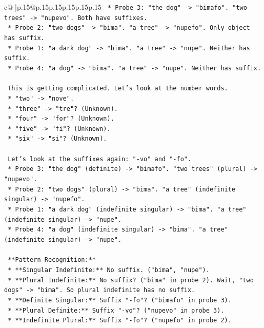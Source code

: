 \documentclass{article}
\begin{document}
{\begin{supertabular}{c@{$\;$}|p{.15\linewidth}@{}p{.15\linewidth}p{.15\linewidth}p{.15\linewidth}p{.15\linewidth}p{.15\linewidth}}
{{{\texttt{        *   Probe 3: "the dog" {-}> "bimafo". "two trees" {-}> "nupevo". Both have suffixes.} \\
\texttt{        *   Probe 2: "two dogs" {-}> "bima". "a tree" {-}> "nupefo". Only object has suffix.} \\
\texttt{        *   Probe 1: "a dark dog" {-}> "bima". "a tree" {-}> "nupe". Neither has suffix.} \\
\texttt{        *   Probe 4: "a dog" {-}> "bima". "a tree" {-}> "nupe". Neither has suffix.} \\
\\ 
\texttt{    This is getting complicated. Let's look at the number words.} \\
\texttt{    *   "two" {-}> "nove".} \\
\texttt{    *   "three" {-}> "tre"? (Unknown).} \\
\texttt{    *   "four" {-}> "for"? (Unknown).} \\
\texttt{    *   "five" {-}> "fi"? (Unknown).} \\
\texttt{    *   "six" {-}> "si"? (Unknown).} \\
\\ 
\texttt{    Let's look at the suffixes again: "{-}vo" and "{-}fo".} \\
\texttt{    *   Probe 3: "the dog" (definite) {-}> "bimafo". "two trees" (plural) {-}> "nupevo".} \\
\texttt{    *   Probe 2: "two dogs" (plural) {-}> "bima". "a tree" (indefinite singular) {-}> "nupefo".} \\
\texttt{    *   Probe 1: "a dark dog" (indefinite singular) {-}> "bima". "a tree" (indefinite singular) {-}> "nupe".} \\
\texttt{    *   Probe 4: "a dog" (indefinite singular) {-}> "bima". "a tree" (indefinite singular) {-}> "nupe".} \\
\\ 
\texttt{    **Pattern Recognition:**} \\
\texttt{    *   **Singular Indefinite:** No suffix. ("bima", "nupe").} \\
\texttt{    *   **Plural Indefinite:** No suffix? ("bima" in probe 2). Wait, "two dogs" {-}> "bima". So plural indefinite has no suffix.} \\
\texttt{    *   **Definite Singular:** Suffix "{-}fo"? ("bimafo" in probe 3).} \\
\texttt{    *   **Plural Definite:** Suffix "{-}vo"? ("nupevo" in probe 3).} \\
\texttt{    *   **Indefinite Plural:** Suffix "{-}fo"? ("nupefo" in probe 2).} \\
}}}
\end{supertabular}}
\end{document}
